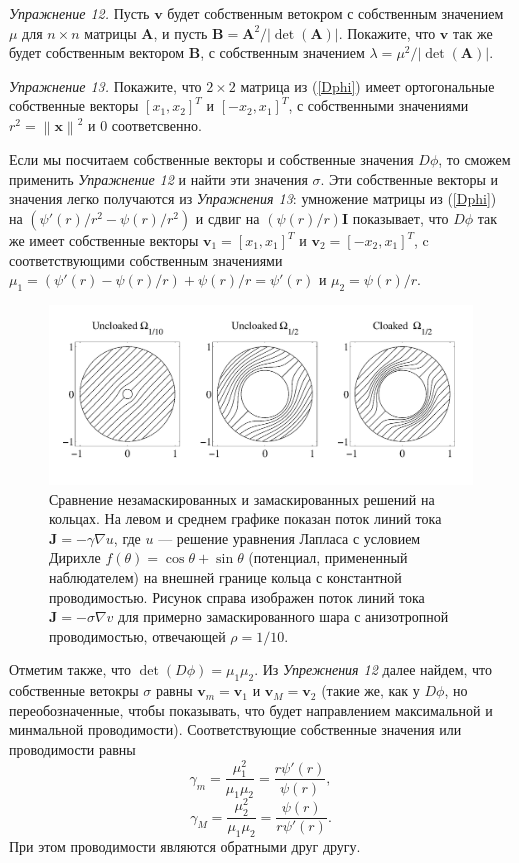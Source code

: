 \documentclass[a4paper, 12pt]{article}
\newcommand{\norm}[1]{\left\lVert#1\right\rVert}
\begin{document}
\textit{Упражнение 12.} Пусть $\textbf{v}$ будет собственным ветокром с собственным
значением $\mu$ для $n \times n$ матрицы $\textbf{A}$, и пусть $\textbf{B} =
\textbf{A}^2/|\det(\textbf{A})|$. Покажите, что $\textbf{v}$ так же будет собственным 
вектором $\textbf{B}$, с собственным значением $\lambda = \mu^2/|\det(\textbf{A})|$.

\textit{Упражнение 13.} Покажите, что $2 \times 2$ матрица из (\ref{Dphi}) имеет
ортогональные собственные векторы $[x_1, x_2]^T$ и $[-x_2, x_1]^T$, с собственными
значениями $r^2 = \norm{\textbf{x}}^2$ и $0$ соответсвенно.

Если мы посчитаем  собственные векторы и собственные значения $D\phi$, то сможем 
применить \textit{Упражнение 12} и найти эти значения $\sigma$. Эти собственные
векторы и значения легко получаются из \textit{Упражнения 13}: умножение матрицы
из (\ref{Dphi}) на $(\psi'(r)/r^2-\psi(r)/r^2)$ и сдвиг на $(\psi(r)/r)\textbf{I}$
показывает, что $D\phi$ так же имеет собственные векторы $\textbf{v}_1 = [x_1, x_1]^T$
и $\textbf{v}_2 = [-x_2, x_1]^T$, c соответствующими собственным значениями
$\mu_1 = (\psi'(r)-\psi(r)/r)+\psi(r)/r = \psi'(r)$ и $\mu_2 = \psi(r)/r$.
\begin{figure}[t]
  \centering
  \includegraphics[height=0.15\paperheight]{5.png}
  \caption{Сравнение незамаскированных и замаскированных решений на кольцах. На левом
  и среднем графике показан поток линий тока $\textbf{J} = -\gamma \nabla u$, 
  где $u$ ---   решение уравнения Лапласа с условием Дирихле 
  $f(\theta) = \cos \theta + \sin\theta$  (потенциал, примененный наблюдателем) на
   внешней границе кольца с константной проводимостью. Рисунок справа изображен
   поток линий тока $\textbf{J} = -\sigma \nabla v$ для примерно замаскированного
   шара с анизотропной проводимостью, отвечающей $\rho = 1/10$.}
  \label{fig:5}
\end{figure}
Отметим также, что $\det(D\phi) = \mu_1\mu_2$. Из \textit{Упрежнения 12} далее найдем,
что собственные ветокры $\sigma$ равны $\textbf{v}_m = \textbf{v}_1$ и
$\textbf{v}_{M}=\textbf{v}_2$ (такие же, как у $D\phi$, но переобозначенные, чтобы
показывать, что будет направлением максимальной и минмальной проводимости).
Соответствующие собственные значения или проводимости равны
\begin{equation*}
\gamma_m = \frac{\mu_1^2}{\mu_1\mu_2} = \frac{r\psi'(r)}{\psi(r)},
\end{equation*}
\begin{equation}\label{eigenvalues}
\gamma_M = \frac{\mu_2^2}{\mu_1\mu_2} = \frac{\psi(r)}{r\psi'(r)}.
\end{equation}
При этом проводимости являются обратными друг другу.
\end{document}
